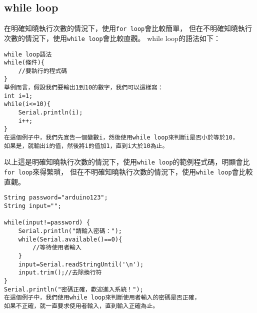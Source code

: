 \documentclass[12pt,a4paper]{article}
\begin{document}
\subsection{while loop}
在明確知曉執行次數的情況下，使用\texttt{for loop}會比較簡單，
但在不明確知曉執行次數的情況下，使用\texttt{while loop}會比較直觀。
while loop的語法如下：
\begin{lstlisting}
while loop語法
while(條件){
    //要執行的程式碼
}
舉例而言，假設我們要輸出1到10的數字，我們可以這樣寫：
int i=1;
while(i<=10){
    Serial.println(i);
    i++;
}
在這個例子中，我們先宣告一個變數i，然後使用while loop來判斷i是否小於等於10，
如果是，就輸出i的值，然後將i的值加1，直到i大於10為止。
\end{lstlisting}
以上這是明確知曉執行次數的情況下，使用\texttt{while loop}的範例程式碼，明顯會比\texttt{for loop}來得繁瑣，
但在不明確知曉執行次數的情況下，使用\texttt{while loop}會比較直觀。
\begin{lstlisting}
String password="arduino123";
String input="";

while(input!=password) {
    Serial.println("請輸入密碼：");
    while(Serial.available()==0){
        //等待使用者輸入
    }
    input=Serial.readStringUntil('\n');
    input.trim();//去除換行符
}
Serial.println("密碼正確，歡迎進入系統！");
在這個例子中，我們使用while loop來判斷使用者輸入的密碼是否正確，
如果不正確，就一直要求使用者輸入，直到輸入正確為止。
\end{lstlisting}
\end{document}
